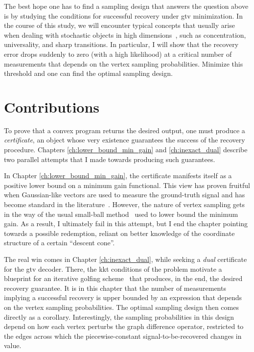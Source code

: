 \begin{center}
\end{center}

The best hope one has to find a sampling design that answers the question above is by studying the conditions for successful recovery under \acrshort{gtv} minimization. In the course of this study, we will encounter typical concepts that usually arise when dealing with stochastic objects in high dimensions~\cite[Ch. 1]{vanhandel2014}, such as concentration, universality, and sharp transitions. In particular, I will show that the recovery error drops suddenly to zero (with a high likelihood) at a critical number of measurements that depends on the vertex sampling probabilities. Minimize this threshold and one can find the optimal sampling design.

\section{Contributions}

To prove that a convex program returns the desired output, one must produce a \emph{certificate}, an object whose very existence guarantees the success of the recovery procedure. Chapters \ref{ch:lower_bound_min_gain} and \ref{ch:inexact_dual} describe two parallel attempts that I made towards producing such guarantees.

In Chapter \ref{ch:lower_bound_min_gain}, the certificate manifests itself as a positive lower bound on a minimum gain functional. This view has proven fruitful when Gaussian-like vectors are used to measure the ground-truth signal and has become standard in the literature~\cite{chandrasekaran2012, tropp2015a}. However, the nature of vertex sampling gets in the way of the usual small-ball method~\cite{mendelson2015, koltchinskii2015} used to lower bound the minimum gain. As a result, I ultimately fail in this attempt, but I end the chapter pointing towards a possible redemption, reliant on better knowledge of the coordinate structure of a certain ``descent cone''.

The real win comes in Chapter \ref{ch:inexact_dual}, while seeking a \emph{dual} certificate for the \acrshort{gtv} decoder. There, the \acrlong{kkt} conditions of the problem motivate a blueprint for an iterative golfing scheme~\cite{gross2011} that produces, in the end, the desired recovery guarantee. It is in this chapter that the number of measurements implying a successful recovery is upper bounded by an expression that depends on the vertex sampling probabilities. The optimal sampling design then comes directly as a corollary. Interestingly, the sampling probabilities in this design depend on how each vertex perturbs the graph difference operator, restricted to the edges across which the piecewise-constant signal-to-be-recovered changes in value.

